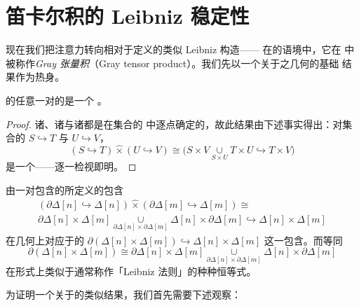 
\section{笛卡尔积的 Leibniz 稳定性}\label{sec:leibniz-stability-cartesian-products}

现在我们把注意力转向相对于\trCartesianProduct{}定义的类似 Leibniz 构造——
在\trMarkedSimplicialSet{}的语境中，它在 \cite{bib129} 中被称作\emph{Gray
张量积}（Gray tensor product）。我们先以一个关于\trLeibnizProduct{}之几何的基础
结果作为热身。

\begin{lemma}\label{lem:leibniz-product-mono}
\trSimplicialSet{}的任意一对\trMonomorphism{}的\trLeibnizProduct{}是一个%
\trMonomorphism。
\end{lemma}

\begin{proof}
诸\trProduct、诸\trPushout{}与诸\trMonomorphism{}都是在集合的\trCategory{}%
中逐点确定的，故此结果由下述事实得出：对集合的\trMonomorphism{}
$S\hookrightarrow T$ 与 $U\hookrightarrow V$，\trLeibnizProduct
\[ (S\hookrightarrow T)\mathbin{\widehat{\times}}(U\hookrightarrow V)
   \cong\bigl(S\times V\underset{S\times U}{\cup}T\times U
   \hookrightarrow T\times V\bigr) \]
是一个\trMonomorphism——逐一检视即明。
\end{proof}

\begin{remark}\label{rem:why-leibniz}
由一对\trSimplex{}\trBoundary{}包含的\trLeibnizProduct{}所定义的包含
\begin{multline*}
(\partial\Delta[n]\hookrightarrow\Delta[n])\mathbin{\widehat{\times}}
(\partial\Delta[m]\hookrightarrow\Delta[m])\cong\\
\partial\Delta[n]\times\Delta[m]
\underset{\partial\Delta[n]\times\partial\Delta[m]}{\cup}
\Delta[n]\times\partial\Delta[m]\hookrightarrow\Delta[n]\times\Delta[m]
\end{multline*}
在几何上对应于\trPrism{}的\trBoundary{}
$\partial(\Delta[n]\times\Delta[m])\hookrightarrow\Delta[n]\times\Delta[m]$
这一包含。而等同
\[ \partial(\Delta[n]\times\Delta[m])\cong
   \partial\Delta[n]\times\Delta[m]
   \underset{\partial\Delta[n]\times\partial\Delta[m]}{\cup}
   \Delta[n]\times\partial\Delta[m] \]
在形式上类似于通常称作「Leibniz 法则」的种种恒等式。
\end{remark}

为证明一个关于\trMarkedSimplicialSet{}的类似结果，我们首先需要下述观察：

